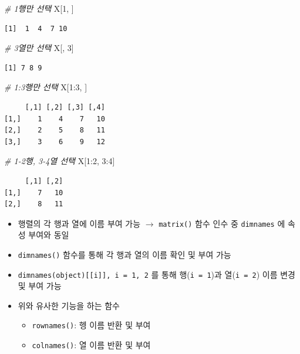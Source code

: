 \documentclass[
  11pt,
]{krantz}
\newenvironment{Shaded}{\begin{snugshade}}{\end{snugshade}}
\newcommand{\CommentTok}[1]{\textcolor[rgb]{0.37,0.37,0.37}{\textit{#1}}}
\newcommand{\DecValTok}[1]{\textcolor[rgb]{0.06,0.06,0.06}{#1}}
\newcommand{\NormalTok}[1]{#1}
\newcommand{\SpecialCharTok}[1]{\textcolor[rgb]{0,0,0}{#1}}
\providecommand{\tightlist}{%
  \setlength{\itemsep}{0pt}\setlength{\parskip}{0pt}}
\begin{document}
\begin{Shaded}
\begin{Highlighting}[]
\CommentTok{\# 1행만 선택}
\NormalTok{X[}\DecValTok{1}\NormalTok{, ]}
\end{Highlighting}
\end{Shaded}

\begin{verbatim}
[1]  1  4  7 10
\end{verbatim}

\begin{Shaded}
\begin{Highlighting}[]
\CommentTok{\# 3열만 선택}
\NormalTok{X[, }\DecValTok{3}\NormalTok{]}
\end{Highlighting}
\end{Shaded}

\begin{verbatim}
[1] 7 8 9
\end{verbatim}

\begin{Shaded}
\begin{Highlighting}[]
\CommentTok{\# 1:3행만 선택}
\NormalTok{X[}\DecValTok{1}\SpecialCharTok{:}\DecValTok{3}\NormalTok{, ]}
\end{Highlighting}
\end{Shaded}

\begin{verbatim}
     [,1] [,2] [,3] [,4]
[1,]    1    4    7   10
[2,]    2    5    8   11
[3,]    3    6    9   12
\end{verbatim}

\begin{Shaded}
\begin{Highlighting}[]
\CommentTok{\# 1{-}2행, 3{-}4열 선택}
\NormalTok{X[}\DecValTok{1}\SpecialCharTok{:}\DecValTok{2}\NormalTok{, }\DecValTok{3}\SpecialCharTok{:}\DecValTok{4}\NormalTok{]}
\end{Highlighting}
\end{Shaded}

\begin{verbatim}
     [,1] [,2]
[1,]    7   10
[2,]    8   11
\end{verbatim}

\normalsize

\begin{itemize}
\tightlist
\item
  행렬의 각 행과 열에 이름 부여 가능 \(\rightarrow\) \texttt{matrix()} 함수 인수 중 \texttt{dimnames} 에 속성 부여와 동일
\item
  \texttt{dimnames()} 함수를 통해 각 행과 열의 이름 확인 및 부여 가능
\item
  \texttt{dimnames(object){[}{[}i{]}{]},\ i\ =\ 1,\ 2} 를 통해 행(\texttt{i\ =\ 1})과 열(\texttt{i\ =\ 2}) 이름 변경 및 부여 가능
\item
  위와 유사한 기능을 하는 함수

  \begin{itemize}
  \tightlist
  \item
    \texttt{rownames()}: 헹 이름 반환 및 부여
  \item
    \texttt{colnames()}: 열 이름 반환 및 부여
  \end{itemize}
\end{itemize}
\end{document}
